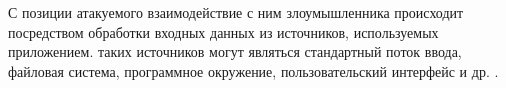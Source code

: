 
\begin{comment}
\SubSubSectionTitle{Файловая система}{software_security_vulnerabilities_file_system}

\Paragraph{Описание}
%
Проблемы безопасности данного вида тесно связаны с взаимодействием приложения с файловой системой. 
%
С точки зрения пользователя, каждый файл имеет, собственно, содержимое, а также набор атрибутов (имя, информация о владельце, атрибуты доступа и др.). 
%
Поэтому риски безопасности при работе с файлами связаны не только с возможностью \Emphasis{чтения или изменения их содержимого}, но также и с \Emphasis{корректностью заданных им атрибутов} \Reference{Drepper2009}.

\Paragraph{Уязвимости}
%
С некорректной работой с файловой системой связан ряд \Important{уязвимостей}. 
%
Некорректно выставленные атрибуты могут способствовать к \Emphasis{несанкционированным чтению или изменению} содержимого файла \Reference{Seacord2008}. 
%
При одновременном использовании файла как разделяемого ресурса между несколькими процессами или потоками возможно \Emphasis{возникнование состояния гонки} (см. подраздел ниже) \Reference{Howard2005} \Reference{AppleSecureCodingGuide2010}. 
%
Наконец, в содержимом файла может храниться \Emphasis{конфиденциальная информация} \Reference{Seacord2008}. 
%
Таким образом можно сделать вывод, что приложение является ответственно за содержимое файлов и за доступ к ним.

\Paragraph{Меры по предотвращению}
%
Для \Important{предотвращения} появления уязвимостей такого рода можно выполнять следующие действия: хранить конфиденциальную информацию в зашифрованном виде, корректно выставлять атрибуты доступа ко всем используемым файлам, рассматривать файлы как потенциально разделяемые ресурсы в условии многозадачности программной среды.

\end{comment}



%
С позиции атакуемого  взаимодействие с ним злоумышленника происходит посредством обработки входных данных из источников, используемых приложением. 
%
 таких источников могут являться стандартный поток ввода, файловая система, программное окружение, пользовательский интерфейс и др.  . 

